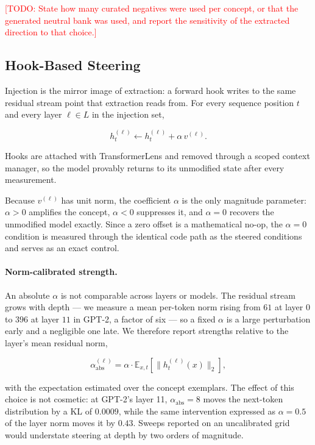 \documentclass[11pt,a4paper]{article}
\newcommand{\todo}[1]{\textcolor{red}{[TODO: #1]}}
\begin{document}
\todo{State how many curated negatives were used per concept, or that the
generated neutral bank was used, and report the sensitivity of the extracted
direction to that choice.}

\subsection{Hook-Based Steering}
\label{sec:steering}

Injection is the mirror image of extraction: a forward hook writes to the same
residual stream point that extraction reads from. For every sequence position
$t$ and every layer $\ell \in L$ in the injection set,

\begin{equation}
  \label{eq:injection}
  h^{(\ell)}_{t} \leftarrow h^{(\ell)}_{t} + \alpha \, v^{(\ell)} .
\end{equation}

Hooks are attached with TransformerLens \citep{nanda2022transformerlens} and
removed through a scoped context manager, so the model provably returns to its
unmodified state after every measurement.

Because $v^{(\ell)}$ has unit norm, the coefficient $\alpha$ is the only
magnitude parameter: $\alpha > 0$ amplifies the concept, $\alpha < 0$ suppresses
it, and $\alpha = 0$ recovers the unmodified model exactly. Since a zero offset
is a mathematical no-op, the $\alpha = 0$ condition is measured through the
identical code path as the steered conditions and serves as an exact control.

\paragraph{Norm-calibrated strength.} An absolute $\alpha$ is not comparable
across layers or models. The residual stream grows with depth --- we measure a
mean per-token norm rising from $61$ at layer $0$ to $396$ at layer $11$ in
GPT-2, a factor of six --- so a fixed $\alpha$ is a large perturbation early
and a negligible one late. We therefore report strengths relative to the
layer's mean residual norm,

\begin{equation}
  \label{eq:relative-strength}
  \alpha^{(\ell)}_{\text{abs}} = \alpha \cdot
  \mathbb{E}_{x, t}\!\left[\lVert h^{(\ell)}_{t}(x) \rVert_{2}\right],
\end{equation}

with the expectation estimated over the concept exemplars. The effect of this
choice is not cosmetic: at GPT-2's layer 11, $\alpha_{\text{abs}} = 8$ moves
the next-token distribution by a KL of $0.0009$, while the same intervention
expressed as $\alpha = 0.5$ of the layer norm moves it by $0.43$. Sweeps
reported on an uncalibrated grid would understate steering at depth by two
orders of magnitude.
\end{document}
